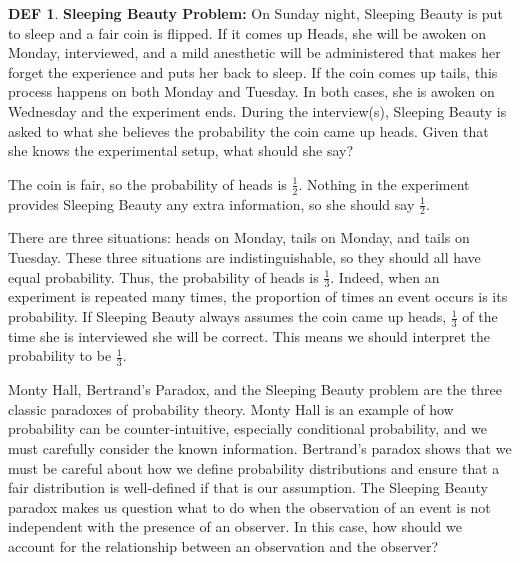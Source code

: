 \documentclass{article}
\theoremstyle{definition}\newtheorem{definition}{DEF}
\theoremstyle{definition}\newtheorem{example}{Ex}
\theoremstyle{lemma}\newtheorem{lemma}{Lemma}
\theoremstyle{corrolary}\newtheorem{corrolary}{Cor}
\begin{document}
\begin{definition}
\textbf{Sleeping Beauty Problem:}
On Sunday night, Sleeping Beauty is put to sleep and a fair coin is flipped.
If it comes up Heads, she will be awoken on Monday, interviewed, and a mild anesthetic will be administered that makes her forget the experience and puts her back to sleep.
If the coin comes up tails, this process happens on both Monday and Tuesday.
In both cases, she is awoken on Wednesday and the experiment ends.
During the interview(s), Sleeping Beauty is asked to what she believes the probability the coin came up heads.
Given that she knows the experimental setup, what should she say?
\end{definition}

The coin is fair, so the probability of heads is $\frac{1}{2}$.
Nothing in the experiment provides Sleeping Beauty any extra information, so she should say $\frac{1}{2}$.

There are three situations: heads on Monday, tails on Monday, and tails on Tuesday.
These three situations are indistinguishable, so they should all have equal probability.
Thus, the probability of heads is $\frac{1}{3}$.
Indeed, when an experiment is repeated many times, the proportion of times an event occurs is its probability.
If Sleeping Beauty always assumes the coin came up heads, $\frac{1}{3}$ of the time she is interviewed she will be correct.
This means we should interpret the probability to be $\frac{1}{3}$.

Monty Hall, Bertrand's Paradox, and the Sleeping Beauty problem are the three classic paradoxes of probability theory.
Monty Hall is an example of how probability can be counter-intuitive, especially conditional probability, and we must carefully consider the known information.
Bertrand's paradox shows that we must be careful about how we define probability distributions and ensure that a fair distribution is well-defined if that is our assumption.
The Sleeping Beauty paradox makes us question what to do when the observation of an event is not independent with the presence of an observer.
In this case, how should we account for the relationship between an observation and the observer?
\end{document}
